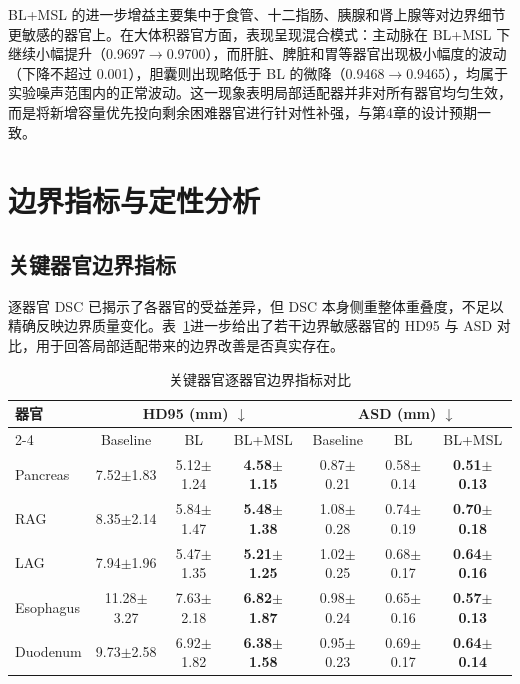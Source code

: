 BL+MSL 的进一步增益主要集中于食管、十二指肠、胰腺和肾上腺等对边界细节更敏感的器官上。在大体积器官方面，表现呈现混合模式：主动脉在 BL+MSL 下继续小幅提升（0.9697$\to$0.9700），而肝脏、脾脏和胃等器官出现极小幅度的波动（下降不超过 0.001），胆囊则出现略低于 BL 的微降（0.9468$\to$0.9465），均属于实验噪声范围内的正常波动。这一现象表明局部适配器并非对所有器官均匀生效，而是将新增容量优先投向剩余困难器官进行针对性补强，与第4章的设计预期一致。

\section{边界指标与定性分析}

\subsection{关键器官边界指标}

逐器官 DSC 已揭示了各器官的受益差异，但 DSC 本身侧重整体重叠度，不足以精确反映边界质量变化。表~\ref{tab:key_organs_boundary}进一步给出了若干边界敏感器官的 HD95 与 ASD 对比，用于回答局部适配带来的边界改善是否真实存在。

\begin{table}[htbp]
  \centering
  \caption{关键器官逐器官边界指标对比}
  \label{tab:key_organs_boundary}
  \small
  \begin{tabular}{lcccccc}
    \hline
    器官 & \multicolumn{3}{c}{HD95 (mm) $\downarrow$} & \multicolumn{3}{c}{ASD (mm) $\downarrow$} \\
    \cline{2-4} \cline{5-7}
         & Baseline & BL & BL+MSL & Baseline & BL & BL+MSL \\
    \hline
    Pancreas   & 7.52$\pm$1.83 & 5.12$\pm$1.24 & \textbf{4.58$\pm$1.15} & 0.87$\pm$0.21 & 0.58$\pm$0.14 & \textbf{0.51$\pm$0.13} \\
    RAG        & 8.35$\pm$2.14 & 5.84$\pm$1.47 & \textbf{5.48$\pm$1.38} & 1.08$\pm$0.28 & 0.74$\pm$0.19 & \textbf{0.70$\pm$0.18} \\
    LAG        & 7.94$\pm$1.96 & 5.47$\pm$1.35 & \textbf{5.21$\pm$1.25} & 1.02$\pm$0.25 & 0.68$\pm$0.17 & \textbf{0.64$\pm$0.16} \\
    Esophagus  & 11.28$\pm$3.27 & 7.63$\pm$2.18 & \textbf{6.82$\pm$1.87} & 0.98$\pm$0.24 & 0.65$\pm$0.16 & \textbf{0.57$\pm$0.13} \\
    Duodenum   & 9.73$\pm$2.58 & 6.92$\pm$1.82 & \textbf{6.38$\pm$1.58} & 0.95$\pm$0.23 & 0.69$\pm$0.17 & \textbf{0.64$\pm$0.14} \\
    \hline
  \end{tabular}
\end{table}

